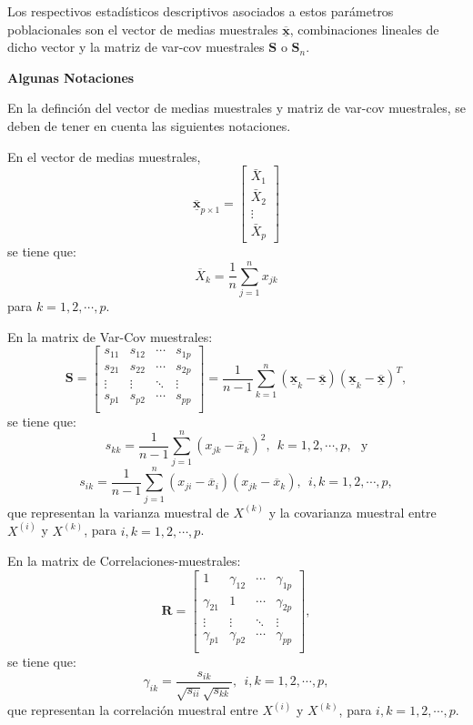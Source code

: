 \documentclass[
]{book}
\theoremstyle{definition}
\theoremstyle{definition}
\theoremstyle{definition}
\theoremstyle{definition}
\theoremstyle{remark}
\begin{document}
Los respectivos estadísticos descriptivos asociados a estos parámetros poblacionales son el vector de medias muestrales \(\underline{\overline{\mathbf{x}}}\), combinaciones lineales de dicho vector y la matriz de var-cov muestrales \(\mathbf{S}\) o \(\mathbf{S}_n\).

\textbf{Algunas Notaciones}

En la definción del vector de medias muestrales y matriz de var-cov muestrales, se deben de tener en cuenta las siguientes notaciones.

En el vector de medias muestrales,
\[
\underline{\overline{\mathbf{x}}}_{p\times 1} =\begin{bmatrix}
\bar{X}_1 \\ \bar{X}_2 \\ \vdots \\ \bar{X}_p
\end{bmatrix}
\]
se tiene que:
\[
\overline{X}_{k}=\frac{1}{n}\sum_{j=1}^n x_{jk}
\]
para \(k=1,2,\cdots, p\).

En la matrix de Var-Cov muestrales:
\[
\mathbf{S}=\begin{bmatrix}
s_{11} & s_{12} & \cdots & s_{1p}\\
s_{21} & s_{22} & \cdots & s_{2p}\\
\vdots & \vdots & \ddots & \vdots\\
s_{p1} & s_{p2} & \cdots & s_{pp}\\
\end{bmatrix}=\frac{1}{n-1}\sum_{k=1}^n(\underline{\mathbf{x}}_k - \underline{\overline{\mathbf{x}}})(\underline{\mathbf{x}}_k - \underline{\overline{\mathbf{x}}})^T ,
\]
se tiene que:
\[
s_{kk}=\frac{1}{n-1}\sum_{j=1}^n (x_{jk}-\overline{x}_k)^2, \ \ k=1,2,\cdots,p, \ \ \ \text{y}
\]
\[
s_{ik}=\frac{1}{n-1}\sum_{j=1}^n (x_{ji}-\overline{x}_i)(x_{jk}-\overline{x}_k), \ \ i,k=1,2,\cdots,p,
\]
que representan la varianza muestral de \(X^{(k)}\) y la covarianza muestral entre \(X^{(i)}\) y \(X^{(k)}\), para \(i,k=1,2,\cdots,p\).

En la matrix de Correlaciones-muestrales:
\[
\mathbf{R}=\begin{bmatrix}
1 & \gamma_{12} & \cdots & \gamma_{1p} \\
\gamma_{21} & 1 & \cdots & \gamma_{2p} \\
\vdots & \vdots & \ddots & \vdots \\
\gamma_{p1} & \gamma_{p2} & \cdots & \gamma_{pp} \\
\end{bmatrix} ,
\]
se tiene que:
\[
\gamma_{ik}=\frac{s_{ik}}{\sqrt{s_{ii}}\sqrt{s_{kk}}}, \ \ i,k=1,2,\cdots,p,
\]
que representan la correlación muestral entre \(X^{(i)}\) y \(X^{(k)}\), para \(i,k=1,2,\cdots,p\).
\end{document}
